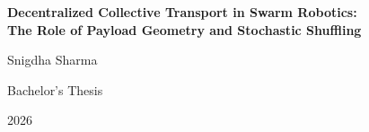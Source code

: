 \documentclass[12pt,a4paper]{report}
\begin{document}
\begin{titlepage}
    \centering
    \vspace*{2cm}
    {\Large\bfseries Decentralized Collective Transport in Swarm Robotics:\\[0.4em]
    The Role of Payload Geometry and Stochastic Shuffling\par}
    \vspace{2cm}
    {\large Snigdha Sharma\par}
    \vspace{1cm}
    {\normalsize Bachelor's Thesis\par}
    \vspace{0.5cm}
    {\normalsize 2026\par}
    \vfill
\end{titlepage}

\tableofcontents
\newpage









\end{document}
